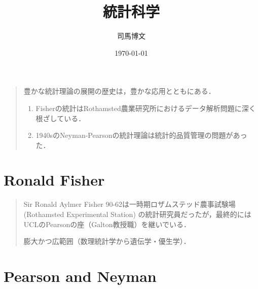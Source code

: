 \documentclass[uplatex,dvipdfmx]{jsreport}
\title{統計科学}
\author{司馬博文}
\date{\today}
\begin{document}
\tableofcontents

\begin{quotation}
    豊かな統計理論の展開の歴史は，豊かな応用とともにある．
    \begin{enumerate}
        \item Fisherの統計はRothamsted農業研究所におけるデータ解析問題に深く根ざしている．
        \item 1940sのNeyman-Pearsonの統計理論は統計的品質管理の問題があった．
    \end{enumerate}
\end{quotation}

\chapter{Ronald Fisher}

\begin{quotation}
    Sir Ronald Aylmer Fisher 90-62は一時期ロザムステッド農事試験場 (Rothamsted Experimental Station) の統計研究員だったが，最終的にはUCLのPearsonの座（Galton教授職）を継いでいる．

    膨大かつ広範囲（数理統計学から遺伝学・優生学）．
    
\end{quotation}

\chapter{Pearson and Neyman}
\end{document}
